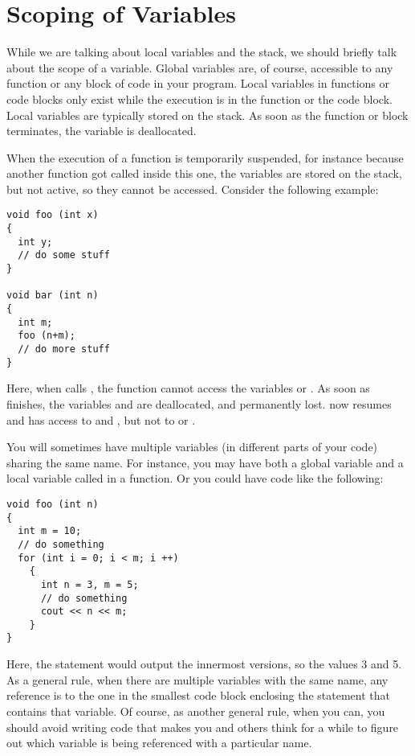 \section{Scoping of Variables}
While we are talking about local variables and the stack, we should
briefly talk about the scope of a variable.
Global variables are, of course, accessible to any function or any
block of code in your program.
Local variables in functions or code blocks only exist while the
execution is in the function or the code block.
Local variables are typically stored on the stack.
As soon as the function or block terminates,
the variable is deallocated. 

When the execution of a function is temporarily suspended,
for instance because another function got called inside this one,
the variables are stored on the stack, but not active,
so they cannot be accessed.
Consider the following example:

\begin{verbatim}
void foo (int x)
{
  int y; 
  // do some stuff
}

void bar (int n)
{ 
  int m;
  foo (n+m);
  // do more stuff
}
\end{verbatim}

Here, when  calls , the function  cannot
access the variables  or .
As soon as  finishes, the variables  and 
are deallocated, and permanently lost.
 now resumes and has access to  and ,
but not to  or .

You will sometimes have multiple variables (in different parts of your
code) sharing the same name.
For instance, you may have both a global variable  and a local
variable called  in a function.
Or you could have code like the following:

\begin{verbatim}
void foo (int n)
{
  int m = 10;
  // do something
  for (int i = 0; i < m; i ++)
    {
      int n = 3, m = 5;
      // do something
      cout << n << m;
    }
}
\end{verbatim}

Here, the  statement would output the innermost
versions, so the values 3 and 5.
As a general rule, when there are multiple variables with the same name,
any reference is to the one in the smallest code block enclosing the
statement that contains that variable.
Of course, as another general rule, when you can, you should avoid
writing code that makes you and others think for a while to figure out
which variable is being referenced with a particular name.

